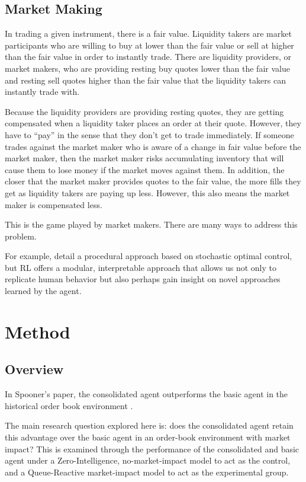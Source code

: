 \documentclass{article}
\begin{document}
\subsection{Market Making}

In trading a given instrument, there is a fair value. Liquidity takers are market participants who are willing to buy at lower than the fair value or sell at higher than the fair value in order to instantly trade. There are liquidity providers, or market makers, who are providing resting buy quotes lower than the fair value and resting sell quotes higher than the fair value that the liquidity takers can instantly trade with.

Because the liquidity providers are providing resting quotes, they are getting compensated when a liquidity taker places an order at their quote. However, they have to ``pay'' in the sense that they don't get to trade immediately. If someone trades against the market maker who is aware of a change in fair value before the market maker, then the market maker risks accumulating inventory that will cause them to lose money if the market moves against them. In addition, the closer that the market maker provides quotes to the fair value, the more fills they get as liquidity takers are paying up less. However, this also means the market maker is compensated less.

This is the game played by market makers. There are many ways to address this problem.

For example, \citet{avellaneda2008} detail a procedural approach based on stochastic optimal control, but RL offers a modular, interpretable approach that allows us not only to replicate human behavior but also perhaps gain insight on novel approaches learned by the agent.

\section{Method}

\subsection{Overview}

In Spooner's paper, the consolidated agent outperforms the basic agent in the historical order book environment \citep{spooner2018}.

The main research question explored here is: does the consolidated agent retain this advantage over the basic agent in an order-book environment with market impact? This is examined through the performance of the consolidated and basic agent under a Zero-Intelligence, no-market-impact model to act as the control, and a Queue-Reactive market-impact model to act as the experimental group.
\end{document}
